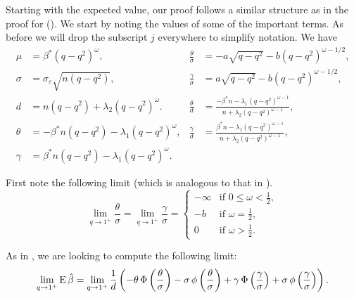 Starting with the expected value, our proof follows a similar structure as in the proof for
 (). We start by noting the
values of some of the important terms. As before we will drop the subscript \(j\)
everywhere to simplify notation. We have
\begin{align*}
  \mu    & = \beta^*(q -q^2)^\omega,                     & \frac{\theta}{\sigma} & = -a\sqrt{q-q^2} - b(q-q^2)^{\omega - 1/2},                                           \\
  \sigma & = \sigma_\varepsilon \sqrt{n(q-q^2)},         & \frac{\gamma}{\sigma} & = a\sqrt{q-q^2} - b(q-q^2)^{\omega - 1/2},                                            \\
  d      & = n(q-q^2) + \lambda_2(q-q^2)^\omega.\,       & \frac{\theta}{d}      & = \frac{-\beta^*n - \lambda_1(q-q^2)^{\omega - 1}}{n + \lambda_2(q-q^2)^{\omega -1}}, \\
  \theta & = -\beta^*n(q-q^2) - \lambda_1(q-q^2)^\omega, & \frac{\gamma}{d}      & = \frac{\beta^*n - \lambda_1(q-q^2)^{\omega - 1}}{n + \lambda_2(q-q^2)^{\omega -1}},  \\
  \gamma & = \beta^*n(q-q^2) - \lambda_1(q-q^2)^\omega.
\end{align*}

First note the following limit (which is analogous to that in ).
\begin{equation}
  \lim_{q \rightarrow 1^+} \frac{\theta}{\sigma} = \lim_{q \rightarrow 1^+} \frac{\gamma}{\sigma} =
  \begin{cases}
    -\infty & \text{if } 0 \leq \omega < \frac{1}{2}, \\
    -b      & \text{if } \omega = \frac{1}{2},        \\
    0       & \text{if } \omega > \frac{1}{2}.
  \end{cases}
\end{equation}

As in , we are looking to compute the following limit:
\begin{equation}
  \label{eq:eval-qlimit-weighted}
  \lim_{q \rightarrow 1^+} \operatorname{E} \hat{\beta} =\lim_{q \rightarrow 1^+}\frac{1}{d}\left(-\theta \operatorname{\Phi}\left(\frac{\theta}{\sigma}\right) - \sigma \operatorname{\phi}\left(\frac{\theta}{\sigma}\right) + \gamma \operatorname{\Phi}\left(\frac{\gamma}{\sigma}\right) + \sigma \operatorname{\phi}\left(\frac{\gamma}{\sigma}\right)\right).
\end{equation}

